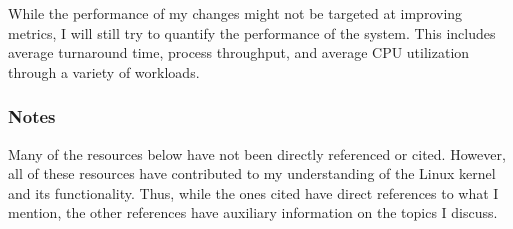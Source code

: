 \documentclass[12pt]{article}
\def\ind{\hspace*{0.3in}}
\begin{document}
\ind While the performance of my changes might not be targeted at improving metrics, I will still try to quantify the performance of the system. This includes average turnaround time, process throughput, and average CPU utilization through a variety of workloads.

\subsubsection*{Notes}

\ind Many of the resources below have not been directly referenced or cited. However, all of these resources have contributed to my understanding of the Linux kernel and its functionality. Thus, while the ones cited have direct references to what I mention, the other references have auxiliary information on the topics I discuss.

\nocite{*}
\raggedright


\end{document}
